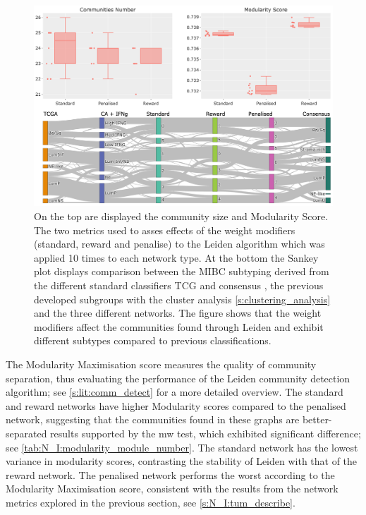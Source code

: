 \begin{figure}[!t]    
    \centering
    \includegraphics[width=1.0\textwidth,keepaspectratio]{Sections/Network_I/Resources/Tum_network/LeidenMetrics_Sankey_TF-6.png}
    \caption[Tum: Leiden metrics]{On the top are displayed the community size and Modularity Score. The two metrics used to asses effects of the weight modifiers (standard, reward and penalise) to the Leiden algorithm which was applied 10 times to each network type. At the bottom the Sankey plot displays comparison between the MIBC subtyping derived from the different standard classifiers TCG and consensus \citep{Robertson2017-mg,Kamoun2020-tj}, the previous developed subgroups with the cluster analysis \cref{s:clustering_analysis} and the three different networks. The figure shows that the weight modifiers affect the communities found through Leiden and exhibit different subtypes compared to previous classifications.}
    \label{fig:N_I:tum_leiden_modifiers}
\end{figure}


The Modularity Maximisation score measures the quality of community separation, thus evaluating the performance of the Leiden community detection algorithm; see \cref{s:lit:comm_detect} for a more detailed overview. The standard and reward networks have higher Modularity scores compared to the penalised network, suggesting that the communities found in these graphs are better-separated results supported by the \acrlong{mw} test, which exhibited significant difference; see \cref{tab:N_I:modularity_module_number}. The standard network has the lowest variance in modularity scores, contrasting the stability of Leiden with that of the reward network. The penalised network performs the worst according to the Modularity Maximisation score, consistent with the results from the network metrics explored in the previous section, see \cref{s:N_I:tum_describe}.

